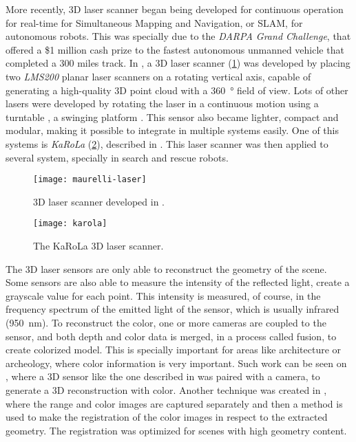 More recently, 3D laser scanner began being developed for continuous operation for real-time for Simultaneous Mapping and Navigation, or SLAM, for autonomous robots. This was specially due to the \textit{DARPA Grand Challenge}, that offered a \$1 million cash prize to the fastest autonomous unmanned vehicle that completed a 300 miles track. In \cite{maurelli2009}, a 3D laser scanner (\cref{fig:maurelli-laser-scanner}) was developed by placing two \textit{LMS200} planar laser scanners on a rotating vertical axis, capable of generating a high-quality 3D point cloud with a \SI{360}{\degree} field of view. Lots of other lasers were developed by rotating the laser in a continuous motion using a turntable \cite{nemoto2007}, a swinging platform \cite{yoshida11}. This sensor also became lighter, compact and modular, making it possible to integrate in multiple systems easily. One of this systems is \textit{KaRoLa} (\cref{fig:karola}), described in \cite{karola14}. This laser scanner was then applied to several system, specially in search and rescue robots.

\begin{figure}[h]
    \centering
    \texttt{[image: maurelli-laser]}
    \caption{3D laser scanner developed in \cite{maurelli2009}.}
    \label{fig:maurelli-laser-scanner}
\end{figure}

\begin{figure}[h]
    \centering
    \texttt{[image: karola]}
    \caption{The KaRoLa 3D laser scanner.}
    \label{fig:karola}
\end{figure}

The 3D laser sensors are only able to reconstruct the geometry of the scene. Some sensors are also able to measure the intensity of the reflected light, create a grayscale value for each point. This intensity is measured, of course, in the frequency spectrum of the emitted light of the sensor, which is usually infrared (\SI{950}{\nano\meter}). To reconstruct the color, one or more cameras are coupled to the sensor, and both depth and color data is merged, in a process called fusion, to create colorized model. This is specially important for areas like architecture or archeology, where color information is very important. Such work can be seen on \cite{pdias2006}, where a 3D sensor like the one described in \cite{surmann2003} was paired with a camera, to generate a 3D reconstruction with color. Another technique was created in \cite{stamus2000}, where the range and color images are captured separately and then a method is used to make the registration of the color images in respect to the extracted geometry. The registration was optimized for scenes with high geometry content.

